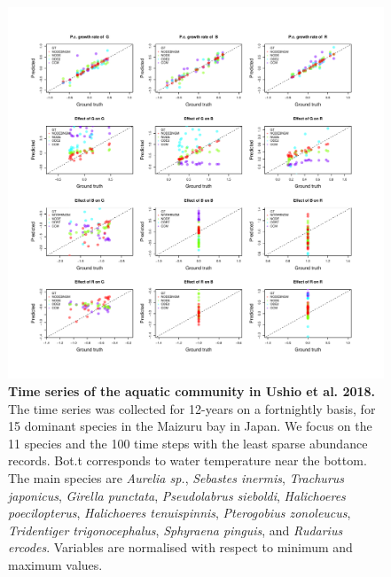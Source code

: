 \documentclass[11pt, oneside]{article}
\begin{document}
\begin{figure}[H]
\includegraphics[width=1\linewidth,page=18]{figures/figures_supplementary.pdf}
\caption{
    \textbf{Time series of the aquatic community in Ushio et al. 2018.}
    The time series was collected for 12-years on a fortnightly basis, for 15 dominant species in the Maizuru bay in Japan. 
    We focus on the 11 species and the 100 time steps with the least sparse abundance records. 
    Bot.t corresponds to water temperature near the bottom. 
    The main species are \textit{Aurelia sp.}, \textit{Sebastes inermis}, \textit{Trachurus japonicus}, \textit{Girella punctata}, \textit{Pseudolabrus sieboldi}, \textit{Halichoeres poecilopterus}, \textit{Halichoeres tenuispinnis}, \textit{Pterogobius zonoleucus}, \textit{Tridentiger trigonocephalus}, \textit{Sphyraena pinguis}, and \textit{Rudarius ercodes}. 
    Variables are normalised with respect to minimum and maximum values.
}
\end{figure}
\newpage
\end{document}
